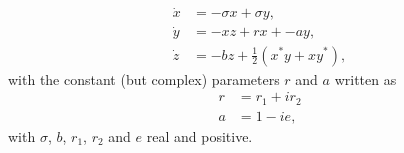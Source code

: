 \documentclass{article}
\begin{document}
\begin{preview}
\begin{align*}
\dot{x} &= -\sigma x + \sigma y, \\
\dot{y} &= -xz + rx + -ay, \\
\dot{z} &= -bz + \frac{1}{2}(x^*y+xy^*), 
\end{align*}
with the constant (but complex) parameters $r$ and $a$ written as 
\begin{align*}
r&=r_1+i r_2 \\
a&=1-ie,
\end{align*}
with $\sigma$, $b$, $r_1$, $r_2$ and $e$ real and positive.
\end{preview}
\end{document}
